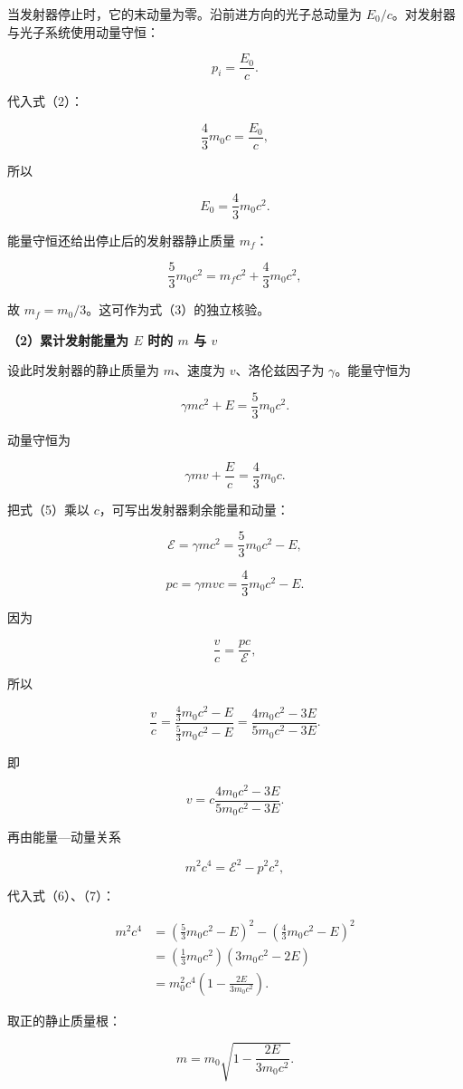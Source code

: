 \documentclass[12pt,a4paper,UTF8]{ctexart}
\begin{document}
当发射器停止时，它的末动量为零。沿前进方向的光子总动量为
\(E_0/c\)。对发射器与光子系统使用动量守恒：

\[
p_i=\frac{E_0}{c}.
\]

代入式（2）：

\[
\frac43m_0c=\frac{E_0}{c},
\]

所以

\[
\boxed{E_0=\frac43m_0c^2}.
\tag{3}
\]

能量守恒还给出停止后的发射器静止质量 \(m_f\)：

\[
\frac53m_0c^2=m_fc^2+\frac43m_0c^2,
\]

故 \(m_f=m_0/3\)。这可作为式（3）的独立核验。

\textbf{（2）累计发射能量为 \(E\) 时的 \(m\) 与 \(v\)}

设此时发射器的静止质量为 \(m\)、速度为 \(v\)、洛伦兹因子为
\(\gamma\)。能量守恒为

\[
\gamma mc^2+E=\frac53m_0c^2.
\tag{4}
\]

动量守恒为

\[
\gamma mv+\frac{E}{c}=\frac43m_0c.
\tag{5}
\]

把式（5）乘以 \(c\)，可写出发射器剩余能量和动量：

\[
\mathcal E
=\gamma mc^2
=\frac53m_0c^2-E,
\tag{6}
\]

\[
pc
=\gamma mvc
=\frac43m_0c^2-E.
\tag{7}
\]

因为

\[
\frac vc=\frac{pc}{\mathcal E},
\]

所以

\[
\frac vc
=\frac{\frac43m_0c^2-E}{\frac53m_0c^2-E}
=\frac{4m_0c^2-3E}{5m_0c^2-3E}.
\]

即

\[
\boxed{v
=c\frac{4m_0c^2-3E}{5m_0c^2-3E}}.
\tag{8}
\]

再由能量---动量关系

\[
m^2c^4=\mathcal E^2-p^2c^2,
\]

代入式（6）、（7）：

\[
\begin{aligned}
m^2c^4
&=\left(\frac53m_0c^2-E\right)^2
-\left(\frac43m_0c^2-E\right)^2\\
&=\left(\frac13m_0c^2\right)
\left(3m_0c^2-2E\right)\\
&=m_0^2c^4\left(1-\frac{2E}{3m_0c^2}\right).
\end{aligned}
\]

取正的静止质量根：

\[
\boxed{m=m_0\sqrt{1-\frac{2E}{3m_0c^2}}}.
\tag{9}
\]
\end{document}

